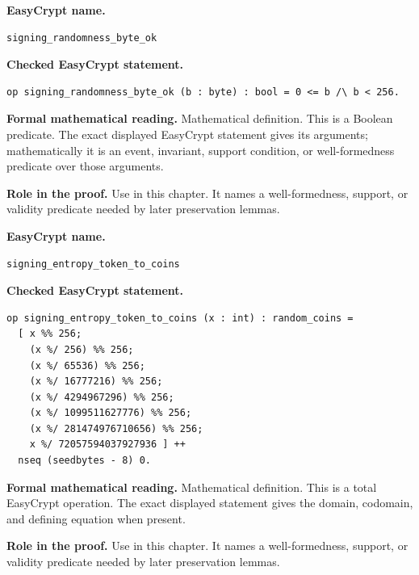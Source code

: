 \begin{formaldefinition}
\noindent\textbf{EasyCrypt name.}
\begin{lstlisting}[language=EasyCrypt,basicstyle=\ttfamily\scriptsize]
signing_randomness_byte_ok
\end{lstlisting}
\noindent\textbf{Checked EasyCrypt statement.}
\begin{lstlisting}[language=EasyCrypt,basicstyle=\ttfamily\scriptsize]
op signing_randomness_byte_ok (b : byte) : bool = 0 <= b /\ b < 256.
\end{lstlisting}
\noindent\textbf{Formal mathematical reading.}
Mathematical definition. This is a Boolean predicate.  The exact displayed EasyCrypt statement gives its arguments; mathematically it is an event, invariant, support condition, or well-formedness predicate over those arguments.

\noindent\textbf{Role in the proof.}
Use in this chapter. It names a well-formedness, support, or validity predicate needed by later preservation lemmas.

\end{formaldefinition}

\begin{formaldefinition}
\noindent\textbf{EasyCrypt name.}
\begin{lstlisting}[language=EasyCrypt,basicstyle=\ttfamily\scriptsize]
signing_entropy_token_to_coins
\end{lstlisting}
\noindent\textbf{Checked EasyCrypt statement.}
\begin{lstlisting}[language=EasyCrypt,basicstyle=\ttfamily\scriptsize]
op signing_entropy_token_to_coins (x : int) : random_coins =
  [ x %% 256;
    (x %/ 256) %% 256;
    (x %/ 65536) %% 256;
    (x %/ 16777216) %% 256;
    (x %/ 4294967296) %% 256;
    (x %/ 1099511627776) %% 256;
    (x %/ 281474976710656) %% 256;
    x %/ 72057594037927936 ] ++
  nseq (seedbytes - 8) 0.
\end{lstlisting}
\noindent\textbf{Formal mathematical reading.}
Mathematical definition. This is a total EasyCrypt operation.  The exact displayed statement gives the domain, codomain, and defining equation when present.

\noindent\textbf{Role in the proof.}
Use in this chapter. It names a well-formedness, support, or validity predicate needed by later preservation lemmas.

\end{formaldefinition}

